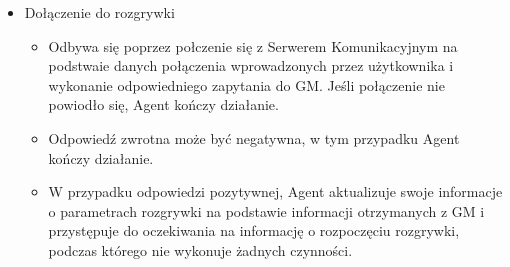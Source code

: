 \documentclass[../Dokumentacja.tex]{subfiles}
\begin{document}
\begin{itemize}
    \item Dołączenie do rozgrywki
    \begin{itemize}
        \item Odbywa się poprzez połczenie się z Serwerem Komunikacyjnym na podstwaie danych połączenia wprowadzonych przez użytkownika i wykonanie odpowiedniego zapytania do GM. Jeśli połączenie nie powiodło się, Agent kończy działanie.
        \item Odpowiedź zwrotna może być negatywna, w tym przypadku Agent kończy działanie.
        \item W przypadku odpowiedzi pozytywnej, Agent aktualizuje swoje informacje o parametrach rozgrywki na podstawie informacji otrzymanych z GM i przystępuje do oczekiwania na informację o rozpoczęciu rozgrywki, podczas którego nie wykonuje żadnych czynności.
    \end{itemize}


\end{itemize}
\end{document}
